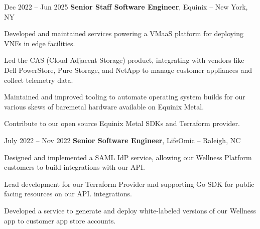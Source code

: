 \vspace{0.2 cm}

\begin{twocolentry}{
		Dec 2022 – Jun 2025
	}
    \textbf{Senior Staff Software Engineer}, Equinix -- New York, NY \end{twocolentry}

\vspace{0.10 cm}
\begin{onecolentry}
	\begin{highlights}
        \item Developed and maintained services powering a VMaaS platform for deploying VNFs in edge facilities.
        \item Led the CAS (Cloud Adjacent Storage) product, integrating with vendors like Dell PowerStore, Pure Storage, and NetApp to manage customer appliances and collect telemetry data.
		\item Maintained and improved tooling to automate operating system builds for our various skews of baremetal hardware available on Equinix Metal.
        \item Contribute to our open source Equinix Metal SDKs and Terraform provider.
	\end{highlights}
\end{onecolentry}

\vspace{0.2 cm}

\begin{twocolentry}{
		July 2022 – Nov 2022
	}
	\textbf{Senior Software Engineer}, LifeOmic -- Raleigh, NC\end{twocolentry}

\vspace{0.10 cm}
\begin{onecolentry}
	\begin{highlights}
		\item Designed and implemented a SAML IdP service, allowing our Wellness Platform customers to build integrations with our API.
		\item Lead development for our Terraform Provider and supporting Go SDK for public facing resources on our API.
integrations.
		\item Developed a service to generate and deploy white-labeled versions of our Wellness app to customer app store accounts.
	\end{highlights}
\end{onecolentry}

\vspace{0.2 cm}

